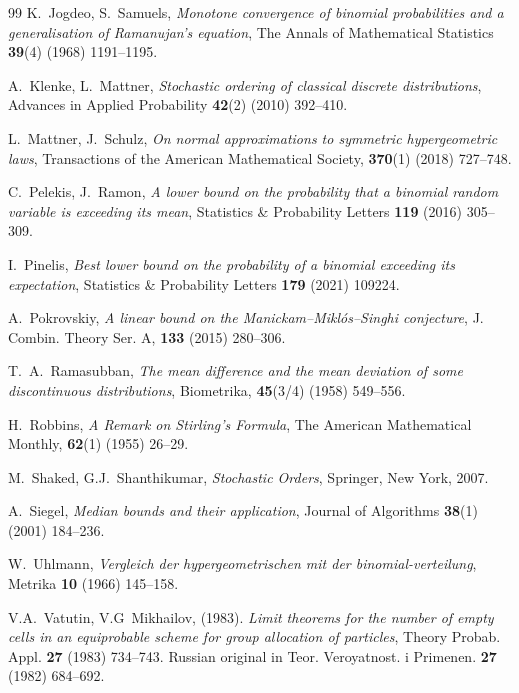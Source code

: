 \documentclass[10pt]{article}
\theoremstyle{plain}
\theoremstyle{definition}
\theoremstyle{remark}
\begin{document}
\begin{thebibliography}{99}
 K.~Jogdeo, S.~Samuels, \textit{Monotone convergence of binomial probabilities and a generalisation of Ramanujan’s equation}, The Annals of Mathematical Statistics \textbf{39}(4) (1968) 1191--1195.


 A.~Klenke, L.~Mattner, \textit{Stochastic ordering of classical discrete distributions}, Advances
in Applied Probability \textbf{42}(2) (2010) 392--410.


 L.~Mattner, J.~Schulz, \textit{On normal approximations to symmetric hypergeometric laws}, Transactions of the American Mathematical Society, \textbf{370}(1) (2018) 727--748.



 C.~Pelekis, J.~Ramon, \textit{A lower bound on the probability that a binomial random variable is exceeding its mean}, Statistics \& Probability Letters \textbf{119} (2016) 305--309.

 I.~Pinelis, \textit{Best lower bound on the probability of a binomial exceeding its expectation}, Statistics \& Probability Letters \textbf{179} (2021) 109224.

 A.~Pokrovskiy, \textit{A linear bound on the Manickam–Mikl\'os–Singhi conjecture}, J. Combin. Theory Ser. A,
\textbf{133} (2015) 280--306.

 T.~A.~Ramasubban, \textit{The mean difference and the mean deviation of some discontinuous
distributions}, Biometrika, \textbf{45}(3/4) (1958) 549--556.

 H.~Robbins, \textit{A Remark on Stirling's Formula}, The American Mathematical Monthly, \textbf{62}(1) (1955) 26--29.


 M.~Shaked, G.J.~Shanthikumar, \textit{Stochastic Orders}, Springer, New York, 2007.


 A.~Siegel, \textit{Median bounds and their application}, Journal of Algorithms   \textbf{38}(1)  (2001) 184--236. 

 W.~Uhlmann, \textit{Vergleich der hypergeometrischen mit der binomial-verteilung}, Metrika 
\textbf{10} (1966) 145--158.

 V.A.~Vatutin, V.G~Mikhailov, (1983). \textit{Limit theorems for the number of empty cells in an
equiprobable scheme for group allocation of particles}, Theory Probab. Appl. \textbf{27} (1983) 734--743. Russian
original in Teor. Veroyatnost. i Primenen. \textbf{27} (1982) 684–692.

\end{thebibliography}
\end{document}
